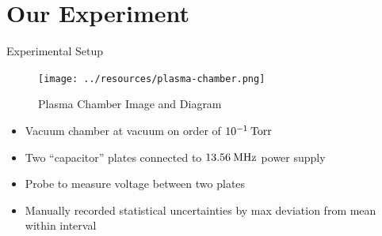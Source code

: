 \documentclass{beamer}
\begin{document}
  \section{Our Experiment}
  
  \begin{frame}{Experimental Setup}
 
        \begin{figure}[H]
        \begin{center}
        \texttt{[image: ../resources/plasma-chamber.png]}
        \hspace{15pt}
        
        \caption{Plasma Chamber Image and Diagram}
        \label{fig: plasma-chamber}
        \end{center}
        \end{figure}

     	\begin{itemize}
        	\item Vacuum chamber at vacuum on order of $10^{-1}\:\rm{Torr}$
            \item Two ``capacitor'' plates connected to $13.56\:\rm{MHz}$ power supply
            \item Probe to measure voltage between two plates
            \item Manually recorded statistical uncertainties by max deviation from mean within interval
        \end{itemize}

  	\end{frame}
  
\end{document}

